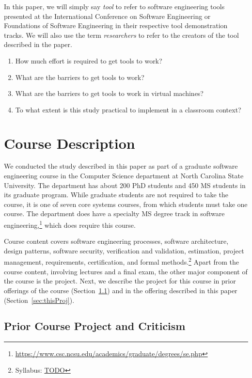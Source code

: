\documentclass[10pt,conference]{IEEEtran}
\begin{document}
In this paper, we will simply say \emph{tool}
to refer to software engineering tools presented at
the International Conference on Software Engineering
or Foundations of Software Engineering in their
respective tool demonstration tracks.
We will also use the term \emph{researchers} to refer to 
the creators of the tool described in the paper. 

\begin{enumerate}
  \item How much effort is required to get tools to work?
  \item What are the barriers to get tools to work?
  \item What are the barriers to get tools to work in virtual machines?
  \item To what extent is this study practical to implement in a classroom context?
\end{enumerate}

\section{Course Description}

We conducted the study described in this paper as 
part of a graduate software engineering course
in the Computer Science department at 
North Carolina State University.
The department has about 200 PhD students and 450
MS students in its graduate program.
While graduate students are not required to
take the course, it is one of seven core systems
courses, from which students must take one course.
The department does have a specialty MS degree
track in software 
engineering,\footnote{\url{https://www.csc.ncsu.edu/academics/graduate/degrees/se.php}}
which does require this course.

Course content covers software engineering processes,
software architecture, design patterns, software security,
verification and validation, estimation, project management,
requirements, certification, and formal 
methods.\footnote{Syllabus: \url{TODO}}
Apart from the course content, involving lectures and
a final exam, the other
major component of the course is the project.
Next, we describe the project for this course 
in prior offerings of the course (Section~\ref{sec:priorProj})
and in the offering described in this paper (Section~\ref{sec:thisProj}).

\subsection{Prior Course Project and Criticism}\label{sec:priorProj}
\end{document}
